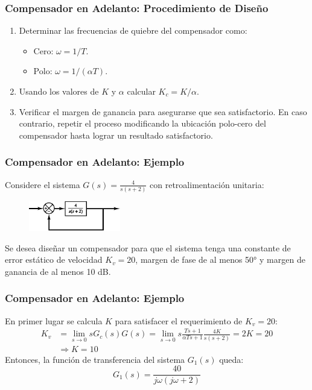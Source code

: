 \documentclass[aspectratio=169]{beamer}
\theoremstyle{definition}
\theoremstyle{plain}
\theoremstyle{remark}
\newcounter{saveenumi}
\newcommand{\seti}{\setcounter{saveenumi}{\value{enumi}}}
\newcommand{\conti}{\setcounter{enumi}{\value{saveenumi}}}
\begin{document}
\begin{frame}[<+->]\frametitle{Compensador en Adelanto: Procedimiento de Diseño}
	\begin{enumerate}
		\conti
		\item Determinar las frecuencias de quiebre del compensador como:
		\begin{itemize}
			\item Cero: $\omega = 1/T$.
			\item Polo: $\omega = 1/(\alpha T)$.
		\end{itemize}
		\item Usando los valores de $K$ y $\alpha$ calcular $K_c = K/\alpha$.
		\item Verificar el margen de ganancia para asegurarse que sea satisfactorio. En caso contrario, repetir el proceso modificando la ubicación polo-cero del compensador hasta lograr un resultado satisfactorio.
		\seti
	\end{enumerate}
\end{frame}

\begin{frame}[<+->]\frametitle{Compensador en Adelanto: Ejemplo}
	Considere el sistema $G(s) = \frac{4}{s(s+2)}$ con retroalimentación unitaria:
	\begin{figure}
		\centering
		\includegraphics[width=4cm]{images/leadCompExampleSystem.eps}
	\end{figure}
	Se desea diseñar un compensador para que el sistema tenga una constante de error estático de velocidad $K_v = 20$, margen de fase de al menos \ang{50} y margen de ganancia de al menos 10 dB.
\end{frame}

\begin{frame}[<+->]\frametitle{Compensador en Adelanto: Ejemplo}
	En primer lugar se calcula $K$ para satisfacer el requerimiento de $K_v = 20$:
	\begin{align*}
		K_v &= \lim_{s\rightarrow 0} sG_c(s)G(s) = \lim_{s \rightarrow 0} s\frac{Ts+1}{\alpha T s + 1} \frac{4K}{s(s+2)} = 2K = 20\\
		&\Rightarrow K = 10
	\end{align*}
	\pause
	Entonces, la función de transferencia del sistema $G_1(s)$ queda:
	\begin{equation*}
		G_1(s) = \frac{40}{j\omega(j\omega+2)}
	\end{equation*}
\end{frame}
\end{document}

